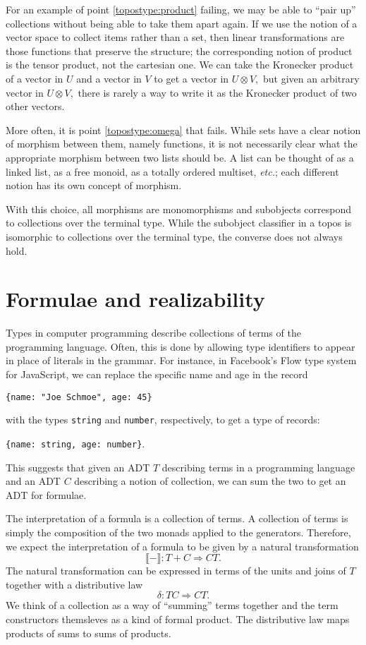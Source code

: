 \documentclass[sigplan,9pt,review,anonymous]{acmart}\settopmatter{printfolios=true,printccs=false,printacmref=false}
\newcommand{\maps}{\colon}
\newcommand{\interp}[1]{\llbracket #1 \rrbracket}
\begin{document}
For an example of point \ref{topostype:product} failing, we may be able to ``pair up'' collections without being able to take them apart again.  If we use the notion of a vector space to collect items rather than a set, then linear transformations are those functions that preserve the structure; the corresponding notion of product is the tensor product, not the cartesian one.  We can take the Kronecker product of a vector in $U$ and a vector in $V$ to get a vector in $U \otimes V,$ but given an arbitrary vector in $U\otimes V,$ there is rarely a way to write it as the Kronecker product of two other vectors.  

More often, it is point \ref{topostype:omega} that fails.  While sets have a clear notion of morphism between them, namely functions, it is not necessarily clear what the appropriate morphism between two lists should be.  A list can be thought of as a linked list, as a free monoid, as a totally ordered multiset, {\em etc.}; each different notion has its own concept of morphism.

  

With this choice, all morphisms are monomorphisms and subobjects correspond to collections over the terminal type.  While the subobject classifier in a topos is isomorphic to collections over the terminal type, the converse does not always hold.

\section{Formulae and realizability}

Types in computer programming describe collections of terms of the programming language.  Often, this is done by allowing type identifiers to appear in place of literals in the grammar.  For instance, in Facebook's Flow type system for JavaScript, we can replace the specific name and age in the record 
\begin{center}
  {\tt \{name: "Joe Schmoe", age: 45\}}
\end{center}
with the types {\tt string} and {\tt number}, respectively, to get a type of records:
\begin{center}
  {\tt \{name: string, age: number\}}.
\end{center}
This suggests that given an ADT $T$ describing terms in a programming language and an ADT $C$ describing a notion of collection, we can sum the two to get an ADT for formulae.  

The interpretation of a formula is a collection of terms.  A collection of terms is simply the composition of the two monads applied to the generators.  Therefore, we expect the interpretation of a formula to be given by a natural transformation
\[ \interp{-}\maps T+C \Rightarrow CT. \]
The natural transformation can be expressed in terms of the units and joins of $T$ together with a distributive law
\[ \delta\maps TC \Rightarrow CT. \]
We think of a collection as a way of ``summing'' terms together and the term constructors themsleves as a kind of formal product.  The distributive law maps products of sums to sums of products.
\end{document}
